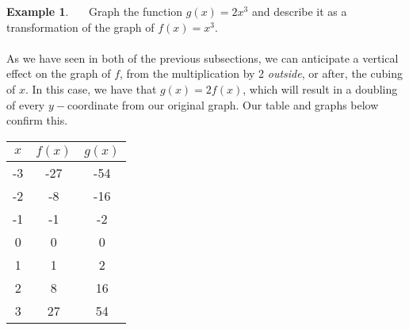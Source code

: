 \documentclass[11pt]{book}
\theoremstyle{definition}  %
\newtheorem{example}{Example}[chapter]
\begin{document}
\begin{example}~~~Graph the function $g(x)=2x^3$ and describe it as a transformation of the graph of $f(x)=x^3$.\\
~\\
As we have seen in both of the previous subsections, we can anticipate a vertical effect on the graph of $f$, from the multiplication by 2 \textit{outside}, or after, the cubing of $x$.  In this case, we have that $g(x)=2f(x)$, which will result in a doubling of every $y-$coordinate from our original graph.  Our table and graphs below confirm this. 

\begin{multicols}{2}
\begin{center}
\begin{tabular}{c||c|c}
$x$ & $f(x)$ &  $g(x)$ \\
\hline
-3 & -27 &  -54 \\
-2 & -8 &  -16 \\
-1 & -1 &  -2 \\
0 & 0 &  0 \\
1 & 1 &  2 \\
2 & 8 &  16 \\
3 & 27 &  54 \\
\end{tabular}
\end{center}


\end{multicols}
\end{example}
\end{document}
